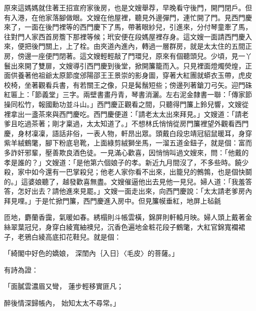 原來這媽媽就住著王招宣府家後房，也是文嫂舉荐，早晚看守後門，開門閉戶。但有入港，在他家落腳做眼。文嫂在他屋裡，聽見外邊彈門，連忙開了門。見西門慶來了，一面在後門裡等的西門慶下了馬，帶著眼紗兒，引進來，分付琴童牽了馬，往對門人家西首房簷下那裡等候；玳安便在段媽屋裡存身。這文嫂一面請西門慶入來，便把後門關上，上了栓。由夾道內進內，轉過一層群房，就是太太住的五間正房，傍邊一座便門閉著。這文嫂輕輕敲了門環兒，原來有個聽頭兒。少頃，見一丫鬟出來開了雙扉，文嫂導引西門慶到後堂，掀開簾籠而入。只見裡面燈燭熒煌，正面供養著他祖爺太原節度邠陽邵王王景崇的影身圖，穿著大紅團就蟒衣玉帶，虎皮校椅，坐著觀看兵書，有若關王之像，只是髯鬚短些；傍邊列著鎗刀弓矢。迎門硃紅匾上：「節義堂」三字。兩壁書畫丹青，琴書消灑。左右泥金隸書一聯：「傳家節操同松竹，報國勳功並斗山。」西門慶正觀看之間，只聽得門簾上鈴兒響，文嫂從裡拿出一盞茶來與西門慶吃。西門慶便道：「請老太太出來拜見。」文嫂道：「請老爹且吃過茶著；剛才稟過，太太知道了。」不想林氏悄悄從房門簾裡望外觀看西門慶，身材凜凜，語話非俗，一表人物，軒昂出眾。頭戴白段忠靖冠貂鼠暖耳，身穿紫羊絨鶴氅，腳下粉底皂靴，上面綠剪絨獅坐馬，一溜五道金鈕子，就是個：富而多詐奸邪輩，壓善欺良酒色徒。一見滿心歡喜，因悄悄叫過文嫂來，問：「他戴的孝是誰的？」文嫂道：「是他第六個娘子的孝。新近九月間沒了，不多些時。饒少殺，家中如今還有一巴掌殺兒；他老人家你看不出來，出籠兒的鷯鶉，也是個快鬬的。」這婆娘聽了，越發歡喜無盡。文嫂催逼他出去見他一見兒。婦人道：「我羞答答，怎好出去？請他進來見罷。」文嫂一面走出來，向西門慶說：「太太請老爹房內拜見哩。」于是忙掀門簾，西門慶進入房中。但見簾幙垂紅，地屏上毡毹

匝地，麝蘭香靄，氣暖如春。綉榻則斗帳雲橫，錦屏則軒轅月映。婦人頭上戴著金絲翠葉冠兒，身穿白綾寬紬襖兒，沉香色遍地金粧花段子鶴氅，大紅官錦寬襴裙子，老鴉白綾高底扣花鞋兒。就是個：

「綺閣中好色的嬌娘，  深閨內｛入日｝〈毛皮〉的菩薩。」

有詩為證：

「面膩雲濃眉又彎，  蓮步輕移實匪凡；

醉後情深歸帳內，  始知太太不尋常。」

